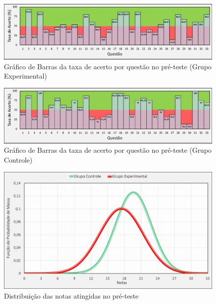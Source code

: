 \begin{figure}[htb]

    \caption{\label{fig:barrasExp}Gráfico de Barras da taxa de acerto por questão no pré-teste (Grupo Experimental)}
    \includegraphics[width=\linewidth]{./Visuais/Notas3.pdf}
  
\end{figure}

\begin{figure}[htb]

    \caption{\label{fig:barrasCon}Gráfico de Barras da taxa de acerto por questão no pré-teste (Grupo Controle)}
    \includegraphics[width=\linewidth]{./Visuais/Notas4.pdf}
  
\end{figure}


\begin{figure}[htb]

    \caption{\label{fig:normal}Distribuição das notas atingidas no pré-teste}
    \includegraphics[width=\linewidth]{./Visuais/Graficos1.pdf}
  
\end{figure}